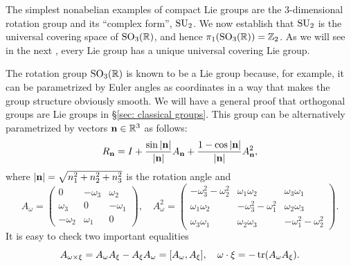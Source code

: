 The simplest nonabelian examples of compact Lie groups are the 3-dimensional rotation group and its ``complex form'', $\SU_2$. We now establish that $\SU_2$ is the universal covering space of $\SO_3(\bbR)$, and hence $\pi_1(\SO_3(\bbR))=\bbZ_2$. As we will see in the next \subsect, every Lie group has a unique universal covering Lie group.

\begin{example}\label{example su2 and so3}
    The rotation group $\SO_3(\bbR)$ is known to be a Lie group because, for example, it can be parametrized by Euler angles as coordinates in a way that makes the group structure obviously smooth. We will have a general proof that orthogonal groups are Lie groups in \S\ref{sec: classical groups}. This group can be alternatively parametrized by vectors $\bf{n}\in\bbR^3$ as follows:
    \[R_{\bf{n}}=I+\frac{\sin |\bf{n}|}{|\bf{n}|}A_{\bf{n}}+\frac{1-\cos |\bf{n}|}{|\bf{n}|}A_{\bf{n}}^2,\]
    where $|\bf{n}|=\sqrt{n_1^2+n_2^2+n_3^2}$ is the rotation angle and 
    \[A_\omega=\begin{pmatrix}
        0&-\omega_3&\omega_2\\
        \omega_3&0&-\omega_1\\
        -\omega_2&\omega_1&0
    \end{pmatrix},\quad 
    A^2_\omega=\begin{pmatrix}
        -\omega_3^2-\omega_2^2 &\omega_1\omega_2 &\omega_3\omega_1\\
        \omega_1\omega_2& -\omega_3^2-\omega_1^2 & \omega_2\omega_3\\
        \omega_3\omega_1 & \omega_2\omega_3 & -\omega_1^2-\omega_2^2
    \end{pmatrix}
    .\]
    It is easy to check two important equalities 
    \[A_{\omega\times \xi}=A_\omega A_\xi-A_\xi A_\omega=[A_\omega,A_\xi],\quad \omega\cdot\xi=-\tr(A_\omega A_\xi).\label{eq R3->so(3) hom}\]

\end{example}

